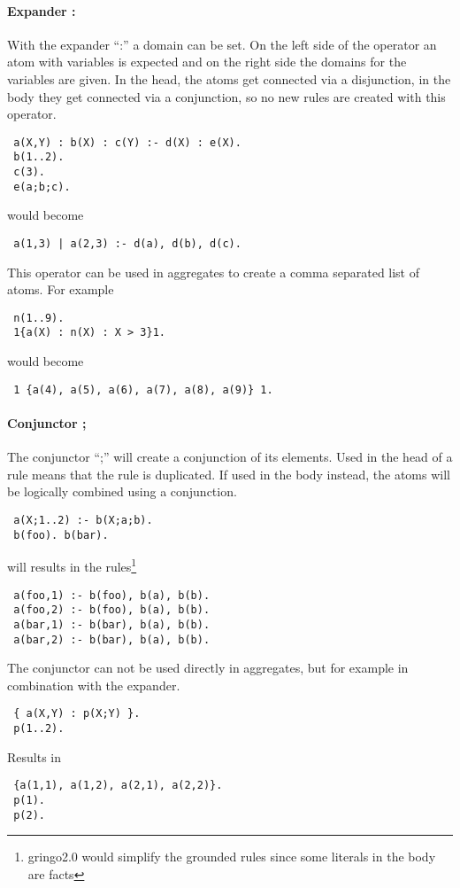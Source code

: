 \documentclass[a4paper,10pt]{article}
\begin{document}
\paragraph{Expander :}
With the expander ``:'' a domain can be set.
On the left side of the operator an atom with variables is expected and on the right side the domains for the variables are given.
In the head, the atoms get connected via a disjunction, in the body they get connected via a conjunction, so no new rules are created with this operator.
\begin{verbatim}
 a(X,Y) : b(X) : c(Y) :- d(X) : e(X).
 b(1..2).
 c(3).
 e(a;b;c).
\end{verbatim}
would become
\begin{verbatim}
 a(1,3) | a(2,3) :- d(a), d(b), d(c).
\end{verbatim}
This operator can be used in aggregates to create a comma separated list of atoms.
For example
\begin{verbatim}
 n(1..9).
 1{a(X) : n(X) : X > 3}1.
\end{verbatim}
would become
\begin{verbatim}
 1 {a(4), a(5), a(6), a(7), a(8), a(9)} 1.
\end{verbatim}

\paragraph{Conjunctor ;}
The conjunctor ``;'' will create a conjunction of its elements.
Used in the head of a rule means that the rule is duplicated.
If used in the body instead, the atoms will be logically combined using a conjunction.
\begin{verbatim}
 a(X;1..2) :- b(X;a;b).
 b(foo). b(bar).
\end{verbatim}
will results in the rules\footnote{gringo2.0 would simplify the grounded rules since some literals in the body are facts}
\begin{verbatim}
 a(foo,1) :- b(foo), b(a), b(b).
 a(foo,2) :- b(foo), b(a), b(b).
 a(bar,1) :- b(bar), b(a), b(b).
 a(bar,2) :- b(bar), b(a), b(b).
\end{verbatim}
The conjunctor can not be used directly in aggregates, but for example in combination with the expander.
\begin{verbatim}
 { a(X,Y) : p(X;Y) }.
 p(1..2).
\end{verbatim}
Results in
\begin{verbatim}
 {a(1,1), a(1,2), a(2,1), a(2,2)}.
 p(1).
 p(2).
\end{verbatim}
\end{document}

